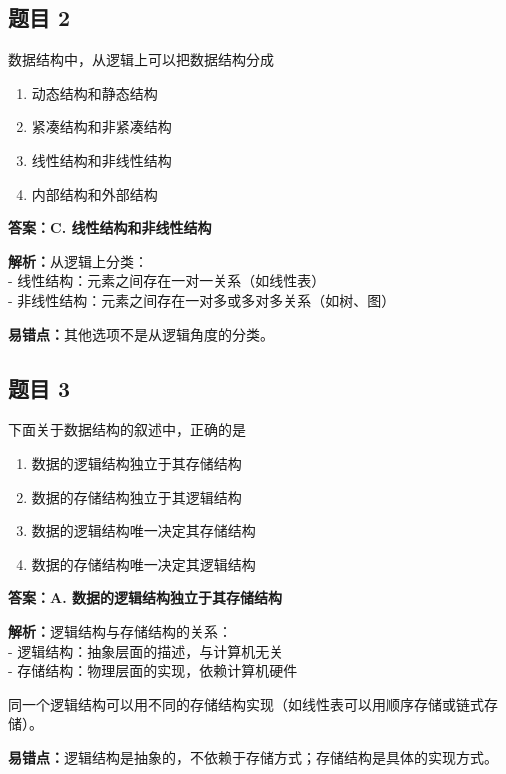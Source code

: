 \documentclass[12pt,a4paper]{ctexart}
\begin{document}
\subsection*{题目 2}
数据结构中，从逻辑上可以把数据结构分成
\begin{enumerate}[label=\Alph*.]
	\item 动态结构和静态结构
	\item 紧凑结构和非紧凑结构
	\item 线性结构和非线性结构
	\item 内部结构和外部结构
\end{enumerate}

\begin{answerbox}
	\textbf{答案：C. 线性结构和非线性结构}

	\textbf{解析：}从逻辑上分类：\\
	- 线性结构：元素之间存在一对一关系（如线性表）\\
	- 非线性结构：元素之间存在一对多或多对多关系（如树、图）

	\textbf{易错点：}其他选项不是从逻辑角度的分类。
\end{answerbox}

\subsection*{题目 3}
下面关于数据结构的叙述中，正确的是
\begin{enumerate}[label=\Alph*.]
	\item 数据的逻辑结构独立于其存储结构
	\item 数据的存储结构独立于其逻辑结构
	\item 数据的逻辑结构唯一决定其存储结构
	\item 数据的存储结构唯一决定其逻辑结构
\end{enumerate}

\begin{answerbox}
	\textbf{答案：A. 数据的逻辑结构独立于其存储结构}

	\textbf{解析：}逻辑结构与存储结构的关系：\\
	- 逻辑结构：抽象层面的描述，与计算机无关\\
	- 存储结构：物理层面的实现，依赖计算机硬件

	同一个逻辑结构可以用不同的存储结构实现（如线性表可以用顺序存储或链式存储）。

	\textbf{易错点：}逻辑结构是抽象的，不依赖于存储方式；存储结构是具体的实现方式。
\end{answerbox}
\end{document}
